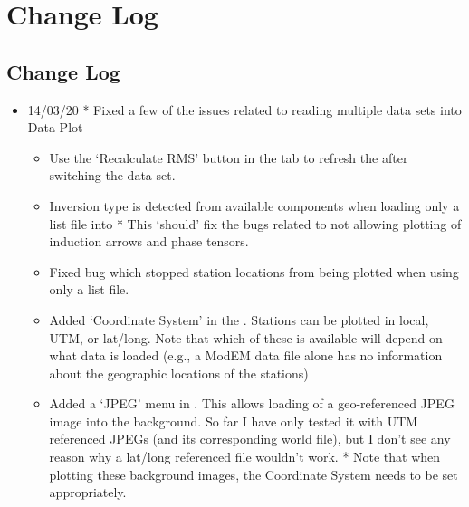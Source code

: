 \documentclass[letterpaper,10pt,english]{sphinxmanual}
\begin{document}
\section{Change Log}
\label{\detokenize{index:change-log}}

\subsection{Change Log}
\label{\detokenize{content/misc/changelog:change-log}}\label{\detokenize{content/misc/changelog::doc}}\begin{itemize}
\item {} 
14/03/20
* Fixed a few of the issues related to reading multiple data sets into Data Plot
\begin{itemize}
\item {} 
Use the ‘Recalculate RMS’ button in the  tab to refresh the {\hyperref[\detokenize{content/data_plot/main_window:misfit-table}]{}} after switching the data set.

\end{itemize}
\begin{itemize}
\item {} 
Inversion type is detected from available components when loading only a list file into {\hyperref[\detokenize{content/data_plot/main_window:data-plot}]{}}
* This ‘should’ fix the bugs related to {\hyperref[\detokenize{content/data_plot/map_viewer:map-viewer}]{}} not allowing plotting of induction arrows and phase tensors.

\item {} 
Fixed bug which stopped station locations from being plotted when using only a list file.

\item {} 
Added ‘Coordinate System’ in the {\hyperref[\detokenize{content/data_plot/map_viewer:map-viewer}]{}}. Stations can be plotted in local, UTM, or lat/long. Note that which of these is available will depend on what data is loaded (e.g., a ModEM data file alone has no information about the geographic locations of the stations)

\item {} 
Added a ‘JPEG’ menu in {\hyperref[\detokenize{content/data_plot/map_viewer:map-viewer}]{}}. This allows loading of a geo-referenced JPEG image into the background. So far I have only tested it with UTM referenced JPEGs (and its corresponding world file), but I don’t see any reason why a lat/long referenced file wouldn’t work.
* Note that when plotting these background images, the Coordinate System needs to be set appropriately.


\end{itemize}
\end{itemize}
\end{document}
